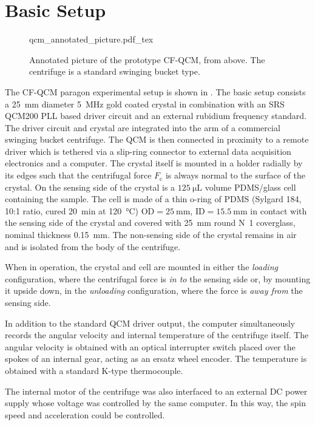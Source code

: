 \section{Basic Setup}
\begin{figure}[ht]
\centering
{qcm_annotated_picture.pdf_tex}
\caption{Annotated picture of the prototype CF-QCM, from above.  The
centrifuge is a standard swinging bucket type.}
\label{fig:cfqcmexpsetup}
\end{figure}
The CF-QCM paragon experimental setup is shown in
.  The basic setup consists a
\SI{25}{\milli\meter} diameter \SI{5}{\mega\hertz} gold coated crystal in
combination with an SRS QCM200 PLL based driver circuit and an external
rubidium frequency standard.  The driver circuit and crystal are integrated
into the arm of a commercial swinging bucket centrifuge.  The QCM is then
connected in proximity to a remote driver which is tethered via a slip-ring
connector to external data acquisition electronics and a computer.  The crystal itself is
mounted in a holder radially by its edges such that the centrifugal force
$F_\mathrm{c}$ is always normal to the surface of the crystal.  On the
sensing side of the crystal is a $\SI{125}{\micro\liter}$ volume PDMS/glass
cell containing the sample.  The cell is made of a thin o-ring of PDMS
(Sylgard 184, 10:1 ratio, cured \SI{20}{\minute} at \SI{120}{\celsius})
$\text{OD}=\SI{25}{\milli\meter}$, $\text{ID}=\SI{15.5}{\milli\meter}$ in
contact with the sensing side of the crystal and covered with
\SI{25}{\milli\meter} round N~1
coverglass, nominal thickness \SI{0.15}{\milli\meter}.  The non-sensing
side of the crystal remains in air and is isolated from the body of the
centrifuge.  

When in operation, the crystal and cell are mounted in either the
\textit{loading} configuration, where the centrifugal force is \textit{in
to} the sensing side or, by mounting it upside down, in the
\textit{unloading} configuration, where the force is \textit{away from} the
sensing side.

In addition to the standard QCM driver output, the computer simultaneously
records the angular velocity and internal temperature of the centrifuge
itself.  The angular velocity is obtained with an optical interrupter
switch placed over the spokes of an internal gear, acting as an ersatz
wheel encoder.  The temperature is obtained with a standard K-type
thermocouple.

The internal motor of the centrifuge was also interfaced to an external DC
power supply whose voltage was controlled by the same computer.  In this
way, the spin speed and acceleration could be controlled.


